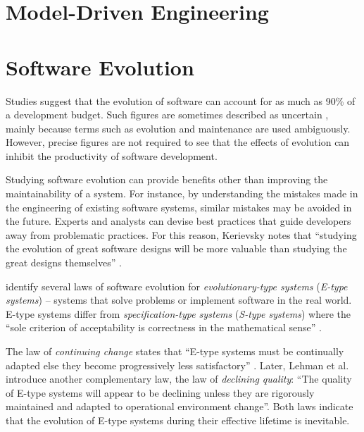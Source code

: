 
\section{Model-Driven Engineering}





\section{Software Evolution}

Studies \cite{erlikh00leveraging,moad90maintaining} suggest that the evolution of software can account for as much as 90\% of a development budget. Such figures are sometimes described as uncertain \cite[ch. 21]{sommerville06software}, mainly because terms such as evolution and maintenance are used ambiguously. However, precise figures are not required to see that the effects of evolution can inhibit the productivity of software development. %

Studying software evolution can provide benefits other than improving the maintainability of a system. For instance, by understanding the mistakes made in the engineering of existing software systems, similar mistakes may be avoided in the future. Experts and analysts can devise best practices that guide developers away from problematic practices. For this reason, Kerievsky notes that ``studying the evolution of great software designs will be more valuable than studying the great designs themselves'' \cite{kerievsky04refactoring}.

\cite{lehman80understanding,lehman78programs,lehman69programming} identify several laws of software evolution for \textit{evolutionary-type systems} (\textit{E-type systems}) -- systems that solve problems or implement software in the real world. E-type systems differ from \textit{specification-type systems} (\textit{S-type systems}) where the ``sole criterion of acceptability is correctness in the mathematical sense'' \cite{lehman85program}.

The law of \textit{continuing change} states that ``E-type systems must be continually adapted else they become progressively less satisfactory'' \cite{lehman78programs}. Later, Lehman et al. \cite{lehman96laws} introduce another complementary law, the law of \textit{declining quality}: ``The quality of E-type systems will appear to be declining unless they are rigorously maintained and adapted to operational environment change''. Both laws indicate that the evolution of E-type systems during their effective lifetime is inevitable.